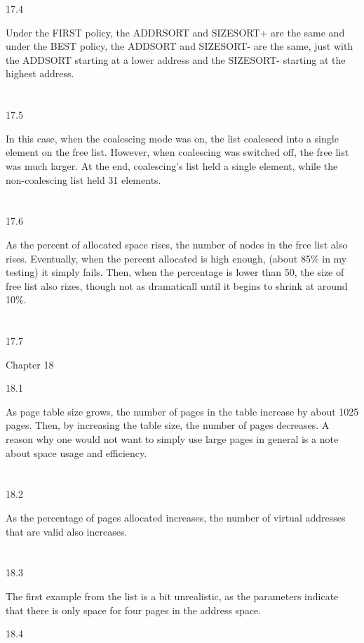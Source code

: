 \documentclass[12pt, a4paper]{article}
\begin{document}
17.4

Under the FIRST policy, the ADDRSORT and SIZESORT+ are the same and under the BEST policy, the ADDSORT and SIZESORT- are the same, just with the ADDSORT starting at a lower address and the SIZESORT- starting at the highest address. \\ \\ \\

17.5

In this case, when the coalescing mode was on, the list coalesced into a single element on the free list. However, when coalescing was switched off, the free list was much larger. At the end, coalescing's list held a single element, while the non-coalescing list held 31 elements. \\ \\ \\

17.6

As the percent of allocated space rises, the number of nodes in the free list also rises. Eventually, when the percent allocated is high enough, (about 85\% in my testing) it simply fails. Then, when the percentage is lower than 50, the size of free list also rizes, though not as dramaticall until it begins to shrink at around 10\%. \\ \\ \\

17.7


Chapter 18

18.1

As page table size grows, the number of pages in the table increase by about 1025 pages. Then, by increasing the table size, the number of pages decreases. A reason why one would not want to simply use large pages in general is a note about space usage and efficiency. \\ \\ \\

18.2

As the percentage of pages allocated increases, the number of virtual addresses that are valid also increases. \\ \\ \\

18.3

The first example from the list is a bit unrealistic, as the parameters indicate that there is only space for four pages in the address space.

18.4
\end{document}
